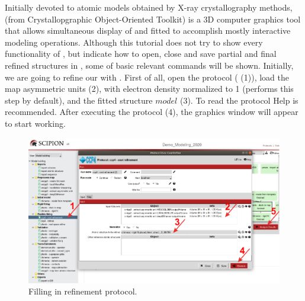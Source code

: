  Initially devoted to atomic models obtained by X-ray crystallography methods, \coot (from Crystallopgraphic Object-Oriented Toolkit) is a 3D computer graphics tool that allows simultaneous display of  and fitted  to accomplish mostly interactive modeling operations. Although this tutorial does not try to show every functionality of \coot, but indicate how to open, close and save partial and final \coot refined structures in \scipion, some of \coot basic relevant commands will be shown. Initially, we are going to refine our  with \coot. First of all, open the  protocol ( (1)), load the map asymmetric units (2), with electron density normalized to 1 (\coot performs this step by default), and the fitted structure $model$ (3). To read the protocol Help is recommended. After executing the protocol (4), the \coot graphics window will appear to start working. 
  
 \begin{figure}[H]
  \centering 
  \captionsetup{width=.9\linewidth} 
  \includegraphics[width=1\textwidth]{Images/Fig24}
  \caption{Filling in \coot refinement protocol.}
  \label{fig:coot_refinement_protocol}
  \end{figure}
  

